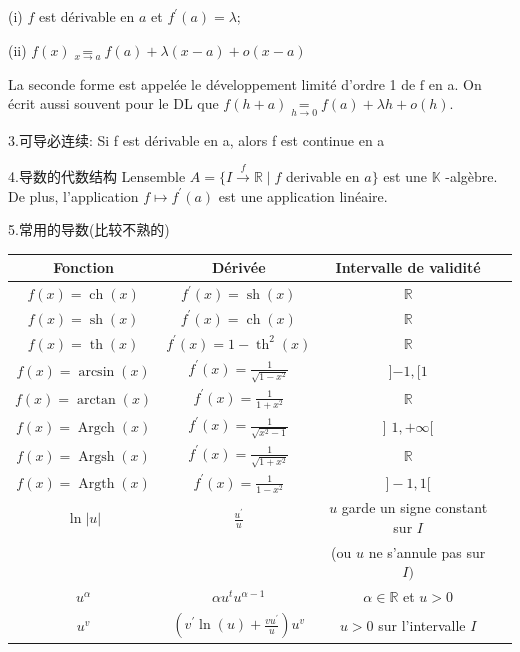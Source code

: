 \documentclass[12pt]{book}
\theoremstyle{definition}\newtheorem{dfn}{Définition}[chapter]
\theoremstyle{plain}\newtheorem{thm}{Théorème}[chapter]
\theoremstyle{plain}\newtheorem{prp}{Proposition}[chapter]
\theoremstyle{plain}\newtheorem{lem}{\bf Lemme}[chapter]
\theoremstyle{plain}\newtheorem{axm}{\bf Axiome}[chapter]
\theoremstyle{plain}\newtheorem{lmm}{\bf Lemme}[chapter]
\theoremstyle{plain}\newtheorem{cor}{\bf Corollaire}[chapter]
\theoremstyle{remark}\newtheorem{rem}{Remarque}[chapter]
\begin{document}
(i) $f$ est dérivable en $a$ et $f^{\prime}(a)=\lambda$;

(ii) $f(x) \underset{x \rightarrow a}{=} f(a)+\lambda(x-a)+o(x-a)$

La seconde forme est appelée le développement limité d'ordre 1 de $\mathrm{f}$ en a.
On écrit aussi souvent pour le DL que $f(h+a) \underset{h \rightarrow 0}{=} f(a)+\lambda h+o(h)$.

3.可导必连续:
Si f est dérivable en a, alors f est continue en a

4.导数的代数结构
Lensemble $A=\{I \stackrel{f}{\rightarrow} \mathbb{R} \mid f$ derivable en $a\}$ est une $\mathbb{K}$ -algèbre. De plus, l'application $f \longmapsto f^{\prime}(a)$ est une application linéaire.

5.常用的导数(比较不熟的)

\begin{tabular}{|c|c|c|c|}
	\hline Fonction & Dérivée & Intervalle de validité \\
	\hline$f(x)=\operatorname{ch}(x)$ & $f^{\prime}(x)=\operatorname{sh}(x)$ & $\mathbb{R}$ \\
	\hline$f(x)=\operatorname{sh}(x)$ & $f^{\prime}(x)=\operatorname{ch}(x)$ & $\mathbb{R}$ \\
	\hline$f(x)=\operatorname{th}(x)$ & $f^{\prime}(x)=1-\operatorname{th}^{2}(x)$ & $\mathbb{R}$ \\
	\hline$f(x)=\arcsin (x)$ & $f^{\prime}(x)=\frac{1}{\sqrt{1-x^{2}}}$ & ]$-1,[1$ \\
	\hline$f(x)=\arctan (x)$ & $f^{\prime}(x)=\frac{1}{1+x^{2}}$ & $\mathbb{R}$ \\
	\hline$f(x)=\operatorname{Argch}(x)$ & $f^{\prime}(x)=\frac{1}{\sqrt{x^{2}-1}}$ & ] $1,+\infty[$ \\
	\hline$f(x)=\operatorname{Argsh}(x)$ & $f^{\prime}(x)=\frac{1}{\sqrt{1+x^{2}}}$ & $\mathbb{R}$ \\
	\hline$f(x)=\operatorname{Argth}(x)$ & $f^{\prime}(x)=\frac{1}{1-x^{2}}$ & $]-1,1[$\\
	\hline $\ln |u|$ & $\frac{u^{\prime}}{u}$& $u$ garde un signe constant sur $I$ \\&&(ou $u$ ne s'annule pas sur $I)$ \\
	\hline$u^{\alpha}$ & $\alpha u^{t} u^{\alpha-1}$ & $\alpha \in \mathbb{R}$ et $u>0$ \\
	\hline$u^{v}$ & $\left(v^{\prime} \ln (u)+\frac{v u^{\prime}}{u}\right) u^{v}$ & $u>0$ sur l'intervalle $I$ \\
	\hline
	\end{tabular}
\\
\end{document}
